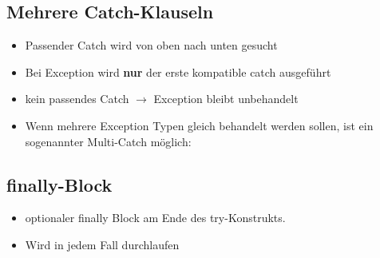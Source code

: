 	\subsection*{Mehrere Catch-Klauseln}
		\begin{minipage}{8.5cm}
			\begin{itemize}[noitemsep]
				\item Passender Catch wird von oben nach unten gesucht
				\item Bei Exception wird \textbf{nur} der erste kompatible catch ausgeführt
				\item kein passendes Catch $\rightarrow$ Exception bleibt unbehandelt
			\end{itemize}
			\vspace*{0.5cm}
			\begin{itemize}[noitemsep]
				\item Wenn mehrere Exception Typen gleich behandelt werden sollen, ist ein sogenannter Multi-Catch möglich:
			\end{itemize}
		\end{minipage}
		\hspace{0.5cm}
		\begin{minipage}{9.8cm}
			
			
		\end{minipage}
	\subsection*{finally-Block}
		\begin{itemize}[noitemsep]
			\item optionaler finally Block am Ende des try-Konstrukts.
			\item Wird in jedem Fall durchlaufen			
		\end{itemize}
		
		
		
		